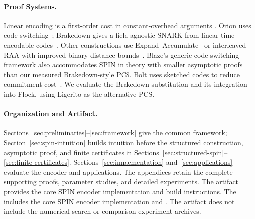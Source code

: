 \paragraph{Proof Systems.}
Linear encoding is a first-order cost in constant-overhead arguments
\cite{rr25}. Orion uses code switching~\cite{orion22}; Brakedown gives
a field-agnostic SNARK from linear-time encodable codes~\cite{brakedown23}.
Other constructions use Expand--Accumulate~\cite{fieldEA24} or
interleaved RAA with improved binary distance bounds~\cite{blaze25}.
Blaze's generic code-switching framework also accommodates SPIN in theory
with smaller asymptotic proofs than our measured Brakedown-style PCS.
Bolt uses sketched codes to reduce commitment cost~\cite{bolt26}.
We evaluate the Brakedown substitution and its integration into Flock,
using Ligerito as the alternative PCS.

\paragraph{Organization and Artifact.}
Sections~\ref{sec:preliminaries}--\ref{sec:framework} give the common framework;
Section~\ref{sec:spin-intuition} builds intuition before the structured
construction, asymptotic proof, and finite certificates in
Sections~\ref{sec:structured-spin}--\ref{sec:finite-certificates}.
Sections~\ref{sec:implementation} and~\ref{sec:applications} evaluate the encoder
and applications. The appendices retain the complete supporting proofs,
parameter studies, and detailed experiments.
\ifsubmission
The artifact provides the core SPIN encoder implementation and build instructions.
\else
The 
includes the core SPIN encoder implementation and
.
\fi
The artifact does not include the numerical-search or comparison-experiment archives.
